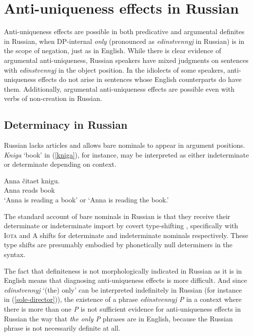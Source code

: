 \section{Anti-uniqueness effects in Russian \label{sec:anti-uniqueness-russian}}
Anti-uniqueness effects are possible in both predicative and argumental definites in Russian, when DP-internal \textit{only} (pronounced as \textit{edinstvennyj} in Russian) is in the scope of negation, just as in English. While there is clear evidence of argumental anti-uniqueness, Russian speakers have mixed judgments on sentences with \textit{edinstvennyj} in the object position. In the idiolects of some speakers, anti-uniqueness effects do not arise in sentences whose English counterparts do have them. Additionally, argumental anti-uniqueness effects are possible even with verbs of non-creation in Russian.

\subsection{Determinacy in Russian}
Russian lacks articles and allows bare nominals to appear in argument positions. \textit{Kniga} `book' in (\ref{kniga}), for instance, may be interpreted as either indeterminate or determinate depending on context.

\begin{exe}
	\ex \label{kniga} \gll Anna \v{c}itaet knigu.\\
	Anna reads book\\
	\glt `Anna is reading a book' or `Anna is reading the book.'
\end{exe}

The standard account of bare nominals in Russian is that they receive their determinate or indeterminate import by covert type-shifting \citep{chierchia98}, specifically with  \textsc{Iota} and \textsc{A} shifts for determinate and indeterminate nominals respectively. These type shifts are presumably embodied by phonetically null determiners in the syntax.

The fact that definiteness is not morphologically indicated in Russian as it is in English means that diagnosing anti-uniqueness effects is more difficult. And since \textit{edinstvennyj} `(the) only' can be interpreted indefinitely in Russian (for instance in (\ref{sole-director})), the existence of a phrase \textit{edinstvennyj P} in a context where there is more than one \textit{P} is not sufficient evidence for anti-uniqueness effects in Russian the way that \textit{the only P} phrases are in English, because the Russian phrase is not necessarily definite at all.

